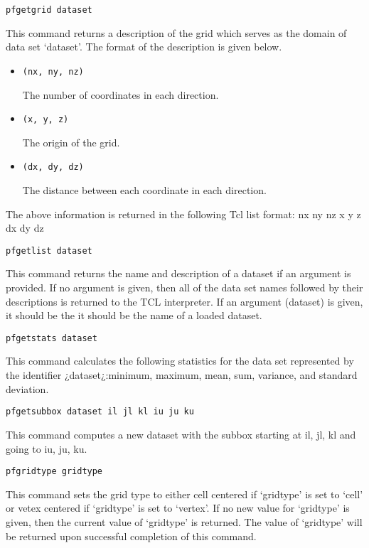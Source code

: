 \begin{description}
\item{\begin{verbatim}pfgetgrid dataset\end{verbatim}}
This command returns a description of the grid which serves as the
domain of data set `dataset'.  The format of the description is given
below.
\begin{itemize}
\item{\begin{verbatim}(nx, ny, nz)\end{verbatim}
The number of coordinates in each direction.}
\item{\begin{verbatim}(x, y, z)\end{verbatim}The origin of the grid.}
\item{\begin{verbatim}(dx, dy, dz)\end{verbatim}The distance between each
coordinate in each direction.}
\end{itemize}
The above information is returned in the following Tcl list format:
{nx ny nz} {x y z} {dx dy dz}

\item{\begin{verbatim}pfgetlist dataset\end{verbatim}}
This command returns the name and description of a dataset if an argument is provided.
If no argument is given, then all of the data set names followed by their descriptions
is returned to the TCL interpreter. If an argument (dataset) is given, it should be the
it should be the name of a loaded dataset.

\item{\begin{verbatim}pfgetstats dataset\end{verbatim}}
This command calculates the following statistics for the data set represented by the
identifier ¿dataset¿:minimum, maximum, mean, sum, variance, and standard deviation.

\item{\begin{verbatim}pfgetsubbox dataset il jl kl iu ju ku\end{verbatim}}
This command computes a new dataset with the subbox starting at il, jl, kl and going to iu, ju, ku.


\item{\begin{verbatim}pfgridtype gridtype\end{verbatim}}
This command sets the grid type to either cell centered if `gridtype'
is set to `cell' or vetex centered if `gridtype' is set to `vertex'.
If no new value for `gridtype' is given, then the current value of
`gridtype' is returned.  The value of `gridtype' will be returned upon
successful completion of this command.



\end{description}
